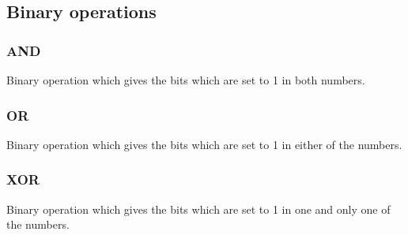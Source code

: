	\subsection{Binary operations}
		\subsubsection{AND}
			Binary operation which gives the bits which are set to 1 in both numbers.
		\subsubsection{OR}
			Binary operation which gives the bits which are set to 1 in either of the numbers.
		\subsubsection{XOR}
			Binary operation which gives the bits which are set to 1 in one and only one of the numbers.
